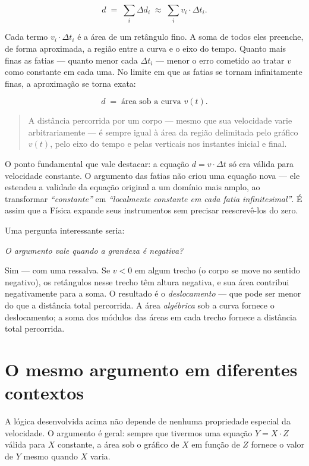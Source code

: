 $$ d \;=\; \sum_i \Delta d_i \;\approx\; \sum_i v_i \cdot \Delta t_i. $$

Cada termo $v_i \cdot \Delta t_i$ é a área de um retângulo fino. A soma de todos eles preenche, de forma aproximada, a região entre a curva e o eixo do tempo. Quanto mais finas as fatias --- quanto menor cada $\Delta t_i$ --- menor o erro cometido ao tratar $v$ como constante em cada uma. No limite em que as fatias se tornam infinitamente finas, a aproximação se torna exata:

$$  d \;=\; \text{área sob a curva } v(t). $$

\begin{quote}
A distância percorrida por um corpo --- mesmo que sua velocidade varie
arbitrariamente --- é sempre igual à área da região delimitada pelo gráfico
$v(t)$, pelo eixo do tempo e pelas verticais nos instantes inicial e final.
\end{quote}

O ponto fundamental que vale destacar: a equação $d = v \cdot \Delta t$ só era válida para velocidade constante. O argumento das fatias não criou uma equação nova --- ele estendeu a validade da equação original a um domínio mais amplo, ao transformar \textit{``constante''} em \textit{``localmente constante em cada fatia infinitesimal''}. É assim que a Física expande seus instrumentos sem precisar reescrevê-los do zero.

Uma pergunta interessante seria:

\begin{center}
    \textit{O argumento vale quando a grandeza é negativa?}
\end{center}



Sim --- com uma ressalva. Se $v < 0$ em algum trecho (o corpo se move no sentido negativo), os retângulos nesse trecho têm altura negativa, e sua área contribui negativamente para a soma. O resultado é o \textit{deslocamento} --- que pode ser menor do que a distância total percorrida. A área \textit{algébrica} sob a curva fornece o deslocamento; a soma dos módulos das áreas em cada trecho fornece a distância total percorrida.


\section*{O mesmo argumento em diferentes contextos}

A lógica desenvolvida acima não depende de nenhuma propriedade especial da velocidade. O argumento é geral: sempre que tivermos uma equação $Y = X \cdot Z$ válida para $X$ constante, a área sob o gráfico de $X$ em função de $Z$ fornece o valor de $Y$ mesmo quando $X$ varia.


